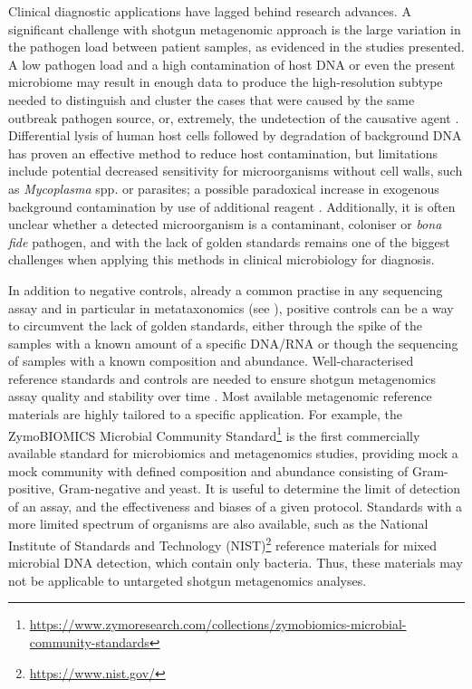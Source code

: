 Clinical diagnostic applications have lagged behind research advances. A significant challenge with shotgun metagenomic approach is the large variation in the pathogen load between patient samples, as evidenced in the studies presented. A low pathogen load and a high contamination of host DNA or even the present microbiome may result in enough data to produce the high-resolution subtype needed to distinguish and cluster the cases that were caused by the same outbreak pathogen source, or, extremely, the undetection of the causative agent \citep{carleton_metagenomic_2019, chiu_clinical_2019}. Differential lysis of human host cells followed by degradation of background DNA has proven an effective method to reduce host contamination, but limitations include potential decreased sensitivity for microorganisms without cell walls, such as \textit{Mycoplasma} spp. or parasites; a possible paradoxical increase in exogenous background contamination by use of additional reagent \citep{salter_reagent_2014, oneil_ribosomal_2013, feehery_method_2013}. Additionally, it is often unclear whether a detected microorganism is a contaminant, coloniser or \textit{bona fide} pathogen, and with the lack of golden standards remains one of the biggest challenges when applying this methods in clinical microbiology for diagnosis. 

In addition to negative controls, already a common practise in any sequencing assay and in particular in metataxonomics (see ), positive controls can be a way to circumvent the lack of golden standards, either through the spike of the samples with a known amount of a specific DNA/RNA or though the sequencing of samples with a known composition and abundance. Well-characterised reference standards and controls are needed to ensure shotgun metagenomics assay quality and stability over time \citep{chiu_clinical_2019, mcintyre_comprehensive_2017}. Most available metagenomic reference materials are highly tailored to a specific application. For example, the ZymoBIOMICS Microbial Community Standard\footnote{\url{https://www.zymoresearch.com/collections/zymobiomics-microbial-community-standards}} is the first commercially available standard for microbiomics and metagenomics studies, providing mock a mock community with defined composition and abundance consisting of Gram-positive, Gram-negative and yeast. It is useful to determine the limit of detection of an assay, and the effectiveness and biases of a given protocol. Standards with a more limited spectrum of organisms are also available, such as the National Institute of Standards and Technology (NIST)\footnote{\url{https://www.nist.gov/}} reference materials for mixed microbial DNA detection, which contain only bacteria. Thus, these materials may not be applicable to untargeted shotgun metagenomics analyses.

